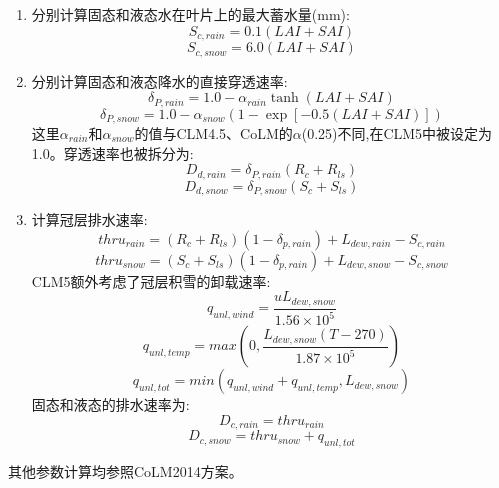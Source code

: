\begin{enumerate}
\item 分别计算固态和液态水在叶片上的最大蓄水量(mm):
\begin{equation}
S_{c,rain}=0.1(LAI+SAI)
\end{equation}
\begin{equation}
S_{c,snow}=6.0(LAI+SAI)
\end{equation}
\item 分别计算固态和液态降水的直接穿透速率:
\begin{equation}
\delta_{P,rain}=1.0 - \alpha_{rain} \tanh(LAI+SAI)
\end{equation}
\begin{equation}
\delta_{P,snow}=1.0 - \alpha_{snow}({1-\exp[-0.5(LAI+SAI)]})
\end{equation}
这里$\alpha_{rain}$和$\alpha_{snow}$的值与CLM4.5、CoLM的$\alpha$(0.25)不同,在CLM5中被设定为1.0。穿透速率也被拆分为:
\begin{equation}
D_{d,rain}=\delta_{P,rain}(R_c+R_{ls})
\end{equation}
\begin{equation}
D_{d,snow}=\delta_{P,snow}(S_c+S_{ls})
\end{equation}
\item 计算冠层排水速率:
\begin{equation}
thru_{rain}=(R_c+R_{ls})(1-\delta_{p,rain})+L_{dew,rain}-S_{c,rain}
\end{equation}
\begin{equation}
thru_{snow}=(S_c+S_{ls})(1-\delta_{p,rain})+L_{dew,snow}-S_{c,snow}
\end{equation}
CLM5额外考虑了冠层积雪的卸载速率:
\begin{equation}\label{q_unl_wind}
q_{unl,wind}=\frac{uL_{dew,snow}}{1.56\times 10^5}
\end{equation}
\begin{equation}
q_{unl,temp}=max(0, \frac{L_{dew,snow}(T-270)}{1.87\times 10^5})
\end{equation}
\begin{equation}\label{q_unl_tot}
q_{unl,tot}=min(q_{unl,wind}+q_{unl,temp},L_{dew,snow})
\end{equation}
固态和液态的排水速率为:
\begin{equation}
D_{c,rain}=thru_{rain}
\end{equation}
\begin{equation}
D_{c,snow}=thru_{snow}+q_{unl,tot}
\end{equation}
\end{enumerate}
其他参数计算均参照CoLM2014方案。
